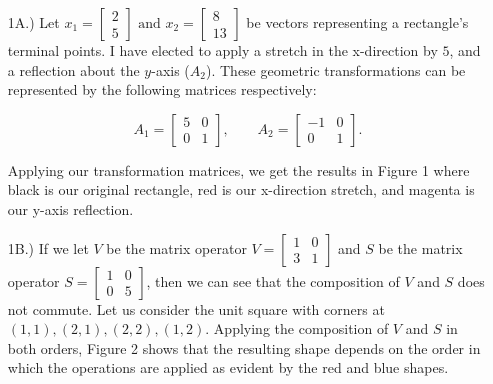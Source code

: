 \documentclass[10pt]{article}
\begin{document}
\noindent{}
\normalsize
\begin{enumerate}[leftmargin=\labelsep]
    \item[1A.)] Let $x_1 = \begin{bmatrix} 2 \\ 5 \end{bmatrix} \text{ and } x_2 = \begin{bmatrix} 8 \\ 13 \end{bmatrix}$ be vectors representing a rectangle's terminal points. 
    I have elected to apply a stretch in the x-direction by $5$, and a reflection about the $y$-axis ($A_2$). These geometric transformations
    can be represented by the following matrices respectively:
    
    \[
        A_1 = 
        \begin{bmatrix}
            5 & 0 \\
            0 & 1
        \end{bmatrix}
        ,
        \qquad A_2 =
        \begin{bmatrix}
            -1 & 0 \\
            0 & 1
        \end{bmatrix}
        .
    \]
    
    Applying our transformation matrices, we get the results in Figure 1 where black is our original rectangle, red is our x-direction stretch, and magenta is our y-axis reflection.

    \item[1B.)] If we let $V$ be the matrix operator $V = \begin{bmatrix} 1 & 0 \\ 3 & 1 \end{bmatrix}$ and $S$ be the matrix operator $S = \begin{bmatrix} 1 & 0 \\ 0 & 5 \end{bmatrix}$, then we can see that the composition of $V$ and $S$ does not commute.
    Let us consider the unit square with corners at $(1, 1), (2, 1), (2, 2), (1, 2)$. Applying the composition of $V$ and $S$ in both orders, Figure 2 shows that the resulting shape depends on the order in which the operations are applied as evident by the red and blue shapes.
    

\end{enumerate}
\end{document}
